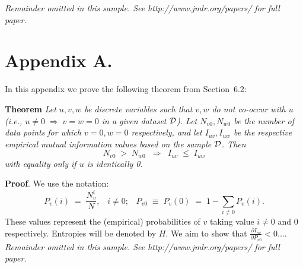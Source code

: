 \documentclass[twoside,11pt]{article}
\newcommand{\dataset}{{\cal D}}
\newcommand{\fracpartial}[2]{\frac{\partial #1}{\partial  #2}}
\begin{document}
{\noindent \em Remainder omitted in this sample. See http://www.jmlr.org/papers/ for full paper.}


\newpage

\appendix
\section*{Appendix A.}
\label{app:theorem}



In this appendix we prove the following theorem from
Section~6.2:

\noindent
{\bf Theorem} {\it Let $u,v,w$ be discrete variables such that $v, w$ do
not co-occur with $u$ (i.e., $u\neq0\;\Rightarrow \;v=w=0$ in a given
dataset $\dataset$). Let $N_{v0},N_{w0}$ be the number of data points for
which $v=0, w=0$ respectively, and let $I_{uv},I_{uw}$ be the
respective empirical mutual information values based on the sample
$\dataset$. Then
\[
	N_{v0} \;>\; N_{w0}\;\;\Rightarrow\;\;I_{uv} \;\leq\;I_{uw}
\]
with equality only if $u$ is identically 0.} \hfill\BlackBox

\noindent
{\bf Proof}. We use the notation:
\[
P_v(i) \;=\;\frac{N_v^i}{N},\;\;\;i \neq 0;\;\;\;
P_{v0}\;\equiv\;P_v(0)\; = \;1 - \sum_{i\neq 0}P_v(i).
\]
These values represent the (empirical) probabilities of $v$
taking value $i\neq 0$ and 0 respectively.  Entropies will be denoted
by $H$. We aim to show that $\fracpartial{I_{uv}}{P_{v0}} < 0$....\\

{\noindent \em Remainder omitted in this sample. See http://www.jmlr.org/papers/ for full paper.}


\vskip 0.2in

\end{document}
